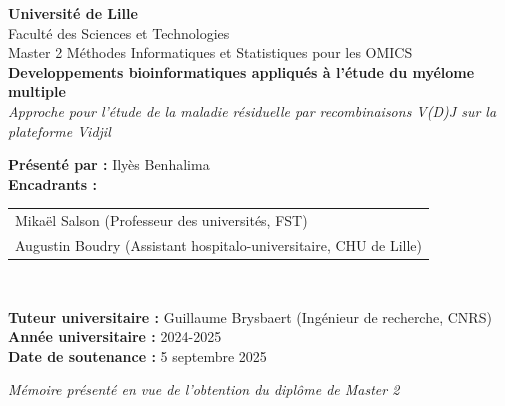 \begin{titlepage}
    \centering
    \vspace*{1cm}

    {\Large \textbf{Université de Lille}}\\[0.5cm]
    {\large Faculté des Sciences et Technologies}\\[0.5cm]
    {\large Master 2 Méthodes Informatiques et Statistiques pour les OMICS}\\[2cm]

    {\Huge \bfseries Developpements bioinformatiques appliqués à l'étude du myélome multiple}\\[1cm]
    {\LARGE \textit{Approche pour l'étude de la maladie résiduelle par recombinaisons V(D)J sur la plateforme Vidjil}}\\[2.5cm]

    \begin{flushleft}
    \textbf{Présenté par :} Ilyès Benhalima\\
    \textbf{Encadrants :}
    \begin{tabular}[t]{@{}l}
        Mikaël Salson (Professeur des universités, FST) \\
        Augustin Boudry (Assistant hospitalo-universitaire, CHU de Lille)
    \end{tabular}\\

    \vspace{1em}

    \textbf{Tuteur universitaire :} Guillaume Brysbaert (Ingénieur de recherche, CNRS)\\[1.5cm]

    \textbf{Année universitaire :} 2024-2025\\
    \textbf{Date de soutenance :} 5 septembre 2025\\
    \end{flushleft}

    \vfill

    \textit{Mémoire présenté en vue de l'obtention du diplôme de Master 2}\\[2cm]


\end{titlepage}
